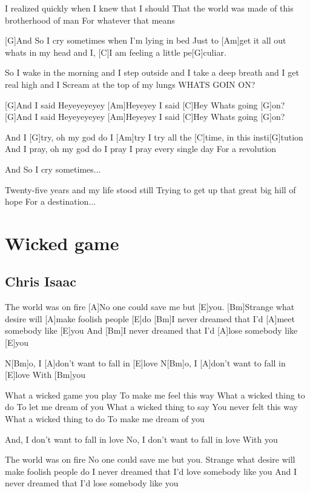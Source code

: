 \documentclass[a4paper,12pt]{article}
\begin{document}
\begin{multicols}{2}
\begin{guitar}
I realized quickly when I knew that I should
That the world was made of this 
brotherhood of man
For whatever that means

                                   
[G]And So I cry sometimes 
when I'm lying in bed
Just to [Am]get it all out
whats in my head and I, 
[C]I am feeling a little pe[G]culiar.

 
So I wake in the morning 
and I step outside
and I take a deep breath 
and I get real high and
I Scream at the top of my lungs 
WHATS GOIN ON?


[G]And I said Heyeyeyeyey 
[Am]Heyeyey
I said [C]Hey Whats going [G]on?
[G]And I said Heyeyeyeyey
[Am]Heyeyey
I said [C]Hey Whats going [G]on?


And I [G]try, oh my god do I [Am]try
I try all the [C]time, in this insti[G]tution
And I pray, oh my god do I pray
I pray every single day
For a revolution

               
And So I cry sometimes...


Twenty-five years and my life stood still
Trying to get up that great big hill of hope
For a destination...


\end{guitar}
\section{Wicked game}
\subsection*{Chris Isaac}
\begin{guitar}
[Bm]The world was on fire 
[A]No one could save me but [E]you.
[Bm]Strange what desire will 
[A]make foolish people [E]do
[Bm]I never dreamed that I'd 
[A]meet somebody like [E]you
And [Bm]I never dreamed that I'd 
[A]lose somebody like [E]you


N[Bm]o, I   [A]don't want to fall in [E]love
N[Bm]o, I   [A]don't want to fall in [E]love
With [Bm]you


What a wicked game you play
To make me feel this way
What a wicked thing to do
To let me dream of you
What a wicked thing to say
You never felt this way
What a wicked thing to do
To make me dream of you


And, I   don't want to fall in love
No, I   don't want to fall in love
With you

      
The world was on fire
No one could save me but you.
Strange what desire will make foolish people do
I never dreamed that I'd love somebody like you
And I never dreamed that I'd lose somebody like you



\end{guitar}
\end{multicols}
\end{document}
